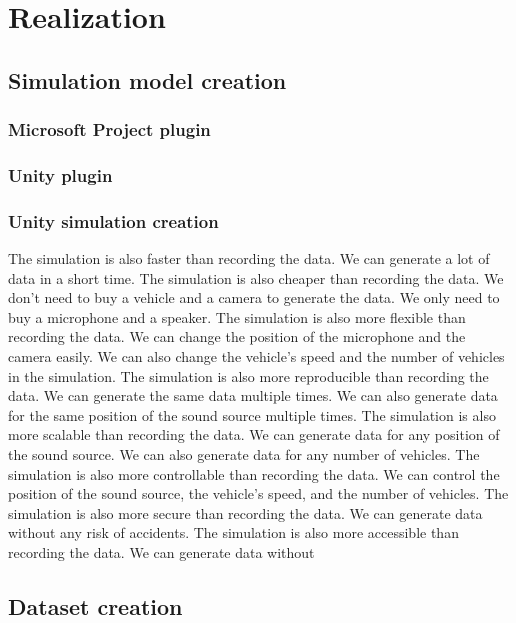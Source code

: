 \chapter{Realization}
\label{ch:setup}

\section{Simulation model creation}

\subsection{Microsoft Project plugin}

\subsection{Unity plugin}

\subsection{Unity simulation creation}

The simulation is also faster than recording the data. We can generate a lot of data in a short time. The simulation is also cheaper than recording the data. We don't need to buy a vehicle and a camera to generate the data. We only need to buy a microphone and a speaker. The simulation is also more flexible than recording the data. We can change the position of the microphone and the camera easily. We can also change the vehicle's speed and the number of vehicles in the simulation. The simulation is also more reproducible than recording the data. We can generate the same data multiple times. We can also generate data for the same position of the sound source multiple times. The simulation is also more scalable than recording the data. We can generate data for any position of the sound source. We can also generate data for any number of vehicles. The simulation is also more controllable than recording the data. We can control the position of the sound source, the vehicle's speed, and the number of vehicles. The simulation is also more secure than recording the data. We can generate data without any risk of accidents. The simulation is also more accessible than recording the data. We can generate data without

\section{Dataset creation}


